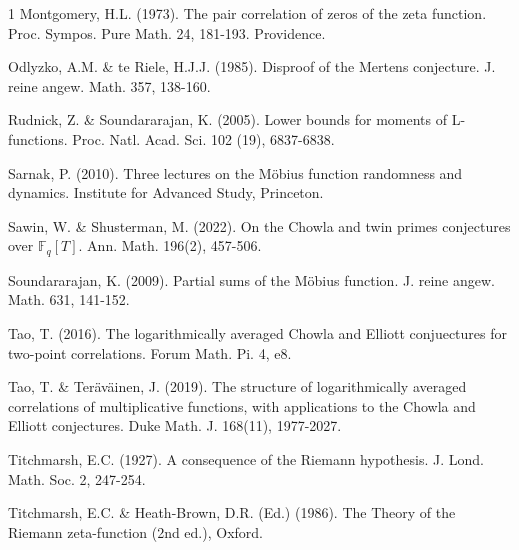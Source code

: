 \documentclass[11pt,article]{amsart}
\numberwithin{equation}{section}
\numberwithin{equation}{section}
\numberwithin{lemma}{section}
\numberwithin{prop}{section}
\begin{document}
\begin{thebibliography}{1}
Montgomery, H.L. (1973). The pair correlation of zeros of the zeta function. Proc. Sympos. Pure Math. 24, 181-193. Providence.

Odlyzko, A.M. \& te Riele, H.J.J. (1985). Disproof of the Mertens conjecture. J. reine angew. Math. 357, 138-160.

Rudnick, Z. \& Soundararajan, K. (2005). Lower bounds for moments of L-functions. Proc. Natl. Acad. Sci. 102 (19), 6837-6838.

Sarnak, P. (2010). Three lectures on the M{\"o}bius function randomness and dynamics. Institute for Advanced Study, Princeton.

Sawin, W. \& Shusterman, M. (2022). On the Chowla and twin primes conjectures over $\mathbb{F}_{q}[T]$. Ann. Math. 196(2), 457-506. 

Soundararajan, K. (2009). Partial sums of the M{\"o}bius function. J. reine angew. Math. 631, 141-152.

Tao, T. (2016). The logarithmically averaged Chowla and Elliott conjuectures for two-point correlations. Forum Math. Pi. 4, e8. 

Tao, T. \& Ter{\"a}v{\"a}inen, J. (2019). The structure of logarithmically averaged correlations of multiplicative functions, with applications to the Chowla and Elliott conjectures. Duke Math. J. 168(11), 1977-2027.

Titchmarsh, E.C. (1927). A consequence of the Riemann hypothesis. J. Lond. Math. Soc. 2, 247-254.

Titchmarsh, E.C. \& Heath-Brown, D.R. (Ed.) (1986). The Theory of the Riemann zeta-function (2nd ed.), Oxford. 

\end{thebibliography}
\end{document}
